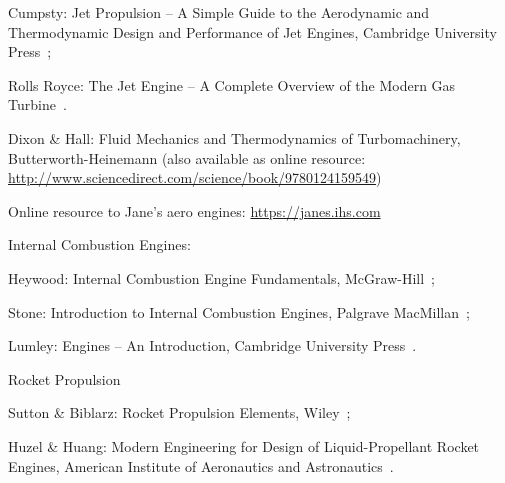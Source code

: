 \begin{itemizePacked}
\begin{itemizePacked}
   \item	Cumpsty: Jet Propulsion -- A Simple Guide to the Aerodynamic and Thermodynamic Design and Performance of Jet Engines, Cambridge University Press~\cite{CUMPSTY_JET_BOOK1997};
   \item	Rolls Royce: The Jet Engine -- A Complete Overview of the Modern Gas Turbine~\cite{ROLLS_ROYCE_BOOK}.
   \item    Dixon \& Hall: Fluid Mechanics and Thermodynamics of Turbomachinery, Butterworth-Heinemann (also available as online resource: \url{http://www.sciencedirect.com/science/book/9780124159549})
   \item    Online resource to Jane's aero engines: \url{https://janes.ihs.com}
  \end{itemizePacked}
   \item	Internal Combustion Engines:
  \begin{itemizePacked}
   \item	Heywood: Internal Combustion Engine Fundamentals, McGraw-Hill~\cite{HEYWOOD_BOOK1988};
   \item	Stone: Introduction to Internal Combustion Engines, Palgrave MacMillan~\cite{STONE_BOOK1999};
   \item	Lumley: Engines -- An Introduction, Cambridge University Press~\cite{LUMLY_BOOK1999}.
  \end{itemizePacked}
   \item	Rocket Propulsion
  \begin{itemizePacked}
   \item	Sutton \& Biblarz: Rocket Propulsion Elements, Wiley~\cite{SUTTON_BIBLARZ_BOOK2010};
   \item    Huzel \& Huang: Modern Engineering for Design of Liquid-Propellant Rocket Engines, 
            American Institute of Aeronautics and Astronautics~\cite{HUZEL_HUANG_BOOK1992}.
  \end{itemizePacked}
\end{itemizePacked}
